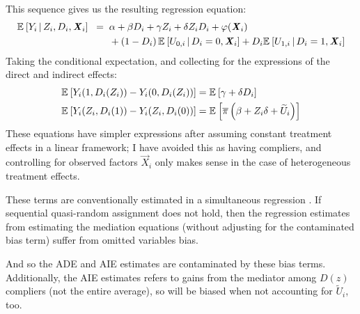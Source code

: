 This sequence gives us the resulting regression equation:
\begin{align*}
    \mathbb{E}_{} \left[ Y_i \, \middle\vert \, Z_i, D_i, \boldsymbol{\mathit{X}}_i \right] \;\; =& \;\;
        \alpha
        + \beta D_i
        + \gamma Z_i
        + \delta Z_i D_i
        + \varphi(\boldsymbol{\mathit{X}}_i) \\
        & \;\; +\left( 1 - D_i \right) \mathbb{E}_{} \left[  U_{0,i}  \, \middle\vert \, D_i = 0, \boldsymbol{\mathit{X}}_i \right]
            + D_i \mathbb{E}_{} \left[  U_{1,i}  \, \middle\vert \, D_i = 1, \boldsymbol{\mathit{X}}_i \right]
\end{align*}
Taking the conditional expectation, and collecting for the expressions of the direct and indirect effects:
\begin{align*}
    \mathbb{E}_{} \left[ Y_i(1, D_i(Z_i)) - Y_i(0, D_i(Z_i)) \right]
        &= \mathbb{E}_{} \left[ \gamma + \delta D_i \right] \\
    \mathbb{E}_{} \left[ Y_i(Z_i, D_i(1)) - Y_i(Z_i, D_i(0)) \right]
        &= \mathbb{E}_{} \left[ \overline{\pi} \left( \beta +  Z_i \delta + \widetilde{U}_i \right) \right]
\end{align*}
These equations have simpler expressions after assuming constant treatment effects in a linear framework;
I have avoided this as having compliers, and controlling for observed factors $\vec X_i$ only makes sense in the case of heterogeneous treatment effects.

These terms are conventionally estimated in a simultaneous regression \citep{imai2010identification}.
If sequential quasi-random assignment does not hold, then the regression estimates from estimating the mediation equations (without adjusting for the contaminated bias term) suffer from omitted variables bias.

And so the ADE and AIE estimates are contaminated by these bias terms.
Additionally, the AIE estimates refers to gains from the mediator among $D(z)$ compliers (not the entire average), so will be biased when not accounting for $\tilde U_i$, too.


